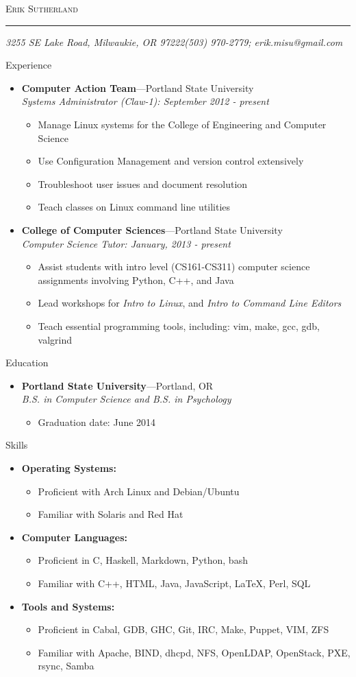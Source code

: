 \documentclass[11pt,oneside]{article}
\makeatletter
\newcommand{\name}{Erik Sutherland}
\newcommand{\addr}{3255 SE Lake Road, Milwaukie, OR 97222}
\newcommand{\phone}{(503) 970-2779}
\newcommand{\email}{erik.misu@gmail.com}
\newcommand{\bigname}[1]{
    \begin{center}\fontfamily{phv}\selectfont\Huge\scshape#1\end{center}
}
\newenvironment{ressection}[1]{
    \vspace{4pt}
    {\fontfamily{phv}\selectfont\Large#1}
    \begin{itemize}
    \vspace{3pt}
}{
    \end{itemize}
}
\newcommand{\resitem}[1]{
    \vspace{-4pt}
    \item \begin{flushleft} #1 \end{flushleft}
}
\newcommand{\ressubitem}[1]{
    \vspace{-1pt}
    \item \begin{flushleft} #1 \end{flushleft}
}
\newcommand{\resbigitem}[3]{
    \vspace{-5pt}
    \item
    \textbf{#1}---#2 \\
    \textit{#3}
}
\newenvironment{ressubsec}[3]{
    \resbigitem{#1}{#2}{#3}
    \vspace{-2pt}
    \begin{itemize}
}{
    \end{itemize}
}
\newenvironment{reslist}[1]{
    \resitem{\textbf{#1}}
    \vspace{-5pt}
    \begin{itemize}
}{
    \end{itemize}
}
\makeatother
\begin{document}
 \selectfont
\bigname{\name}
\vspace{-8pt} \rule{\textwidth}{1pt}
\vspace{-1pt} {\small\itshape \addr \hfill \phone; \email}
\vspace{8 pt}


\begin{ressection}{Experience}
    \begin{ressubsec}{Computer Action Team}{Portland State University}{Systems Administrator (Claw-1): September 2012 - present}
        \ressubitem{Manage Linux systems for the College of Engineering and Computer Science}
        \ressubitem{Use Configuration Management and version control extensively}
        \ressubitem{Troubleshoot user issues and document resolution}
        \ressubitem{Teach classes on Linux command line utilities}
    \end{ressubsec}
    \begin{ressubsec}{College of Computer Sciences}{Portland State University}{Computer Science Tutor: January, 2013 - present}
        \ressubitem{Assist students with intro level (CS161-CS311) computer science assignments involving Python, C++, and Java}
        \ressubitem{Lead workshops for \textit{Intro to Linux}, and \textit{Intro to Command Line Editors}}
        \ressubitem{Teach essential programming tools, including: vim, make, gcc, gdb, valgrind}
    \end{ressubsec}
\end{ressection}


\begin{ressection}{Education}
    \begin{ressubsec}{Portland State University}{Portland, OR}{B.S. in Computer Science and B.S. in Psychology}
    \ressubitem{Graduation date: June 2014}
    \end{ressubsec}
\end{ressection}


\begin{ressection}{Skills}
    \begin{reslist}{Operating Systems:}
        \ressubitem{Proficient with Arch Linux and Debian/Ubuntu}
        \ressubitem{Familiar with Solaris and Red Hat}
    \end{reslist}
    \begin{reslist}{Computer Languages:}
        \ressubitem{Proficient in C, Haskell, Markdown, Python, bash}
        \ressubitem{Familiar with C++, HTML, Java, JavaScript, \LaTeX, Perl, SQL}
    \end{reslist}
    \begin{reslist}{Tools and Systems:}
        \ressubitem{Proficient in Cabal, GDB, GHC, Git, IRC, Make, Puppet, VIM, ZFS}
        \ressubitem{Familiar with Apache, BIND, dhcpd, NFS, OpenLDAP, OpenStack, PXE, rsync, Samba}
    \end{reslist}
\end{ressection}
\end{document}

